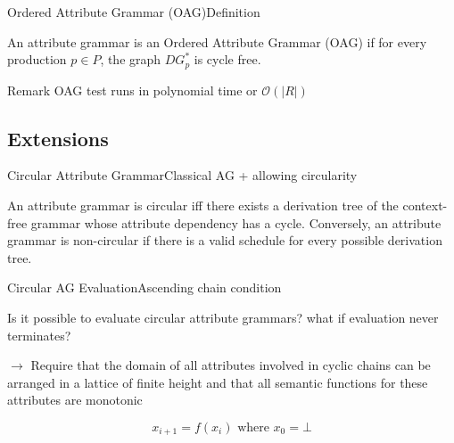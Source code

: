 \begin{frame}{Ordered Attribute Grammar (OAG)}{Definition}

\begin{definition}
An attribute grammar is an Ordered Attribute Grammar (OAG) if for every production $p \in P$, the graph $\mathit{DG}_p^*$ is \alert{cycle free}.
\end{definition}

\begin{block}{Remark}
OAG test runs in polynomial time or $\mathcal{O}(|R|)$
\end{block}


\end{frame}


\subsection*{Extensions}

\begin{frame}{Circular Attribute Grammar}{Classical AG + allowing circularity}
\begin{definition}
An attribute grammar is \alert{circular} iff there exists a derivation tree of the context-free grammar whose \alert{attribute dependency has a cycle}. Conversely, an attribute grammar is non-circular if there is a valid schedule for every possible derivation tree.
\end{definition}
\end{frame}


\begin{frame}{Circular AG Evaluation}{Ascending chain condition}

Is it possible to evaluate circular attribute grammars? what if \alert{evaluation never terminates}?

\newlinevspace

$\to$ Require that the domain of all attributes involved in cyclic chains can be arranged in a \alert{lattice of finite height} and that all semantic functions for these attributes are \alert{monotonic}

\[ x_{i+1} = f(x_i) \text{ where } x_0 = \bot \]

\end{frame}

